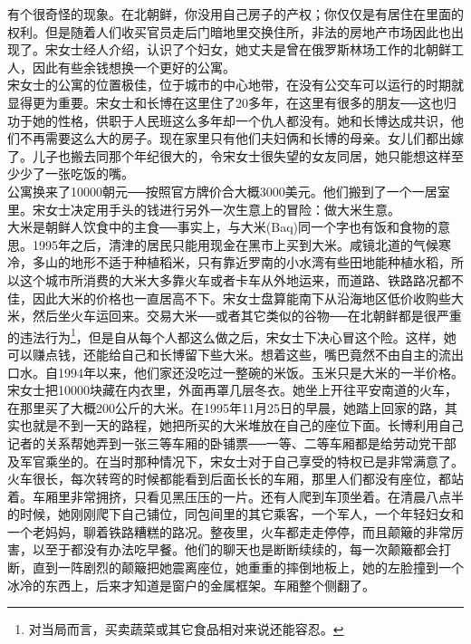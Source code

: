 有个很奇怪的现象。在北朝鲜，你没用自己房子的产权；你仅仅是有居住在里面的权利。但是随着人们收买官员走后门暗地里交换住所，非法的房地产市场因此也出现了。宋女士经人介绍，认识了个妇女，她丈夫是曾在俄罗斯林场工作的北朝鲜工人，因此有些余钱想换一个更好的公寓。\\

宋女士的公寓的位置极佳，位于城市的中心地带，在没有公交车可以运行的时期就显得更为重要。宋女士和长博在这里住了20多年，在这里有很多的朋友──这也归功于她的性格，供职于人民班这么多年却一个仇人都没有。她和长博达成共识，他们不再需要这么大的房子。现在家里只有他们夫妇俩和长博的母亲。女儿们都出嫁了。儿子也搬去同那个年纪很大的，令宋女士很失望的女友同居，她只能想这样至少少了一张吃饭的嘴。\\

公寓换来了10000朝元──按照官方牌价合大概3000美元。他们搬到了一个一居室里。宋女士决定用手头的钱进行另外一次生意上的冒险：做大米生意。\\

大米是朝鲜人饮食中的主食──事实上，与大米(Baq)同一个字也有饭和食物的意思。1995年之后，清津的居民只能用现金在黑市上买到大米。咸镜北道的气候寒冷，多山的地形不适于种植稻米，只有靠近罗南的小水湾有些田地能种植水稻，所以这个城市所消费的大米大多靠火车或者卡车从外地运来，而道路、铁路路况都不佳，因此大米的价格也一直居高不下。宋女士盘算能南下从沿海地区低价收购些大米，然后坐火车运回来。交易大米──或者其它类似的谷物──在北朝鲜都是很严重的违法行为\footnote{对当局而言，买卖蔬菜或其它食品相对来说还能容忍。}，但是自从每个人都这么做之后，宋女士下决心冒这个险。这样，她可以赚点钱，还能给自己和长博留下些大米。想着这些，嘴巴竟然不由自主的流出口水。自1994年以来，他们家还没吃过一整碗的米饭。玉米只是大米的一半价格。\\

宋女士把10000块藏在内衣里，外面再罩几层冬衣。她坐上开往平安南道的火车，在那里买了大概200公斤的大米。在1995年11月25日的早晨，她踏上回家的路，其实也就是不到一天的路程，她把所买的大米堆放在自己的座位下面。长博利用自己记者的关系帮她弄到一张三等车厢的卧铺票──一等、二等车厢都是给劳动党干部及军官乘坐的。在当时那种情况下，宋女士对于自己享受的特权已是非常满意了。火车很长，每次转弯的时候都能看到后面长长的车厢，那里人们都没有座位，都站着。车厢里非常拥挤，只看见黑压压的一片。还有人爬到车顶坐着。在清晨八点半的时候，她刚刚爬下自己铺位，同包间里的其它乘客，一个军人，一个年轻妇女和一个老妈妈，聊着铁路糟糕的路况。整夜里，火车都走走停停，而且颠簸的非常厉害，以至于都没有办法吃早餐。他们的聊天也是断断续续的，每一次颠簸都会打断，直到一阵剧烈的颠簸把她震离座位，她重重的摔倒地板上，她的左脸撞到一个冰冷的东西上，后来才知道是窗户的金属框架。车厢整个侧翻了。\\

